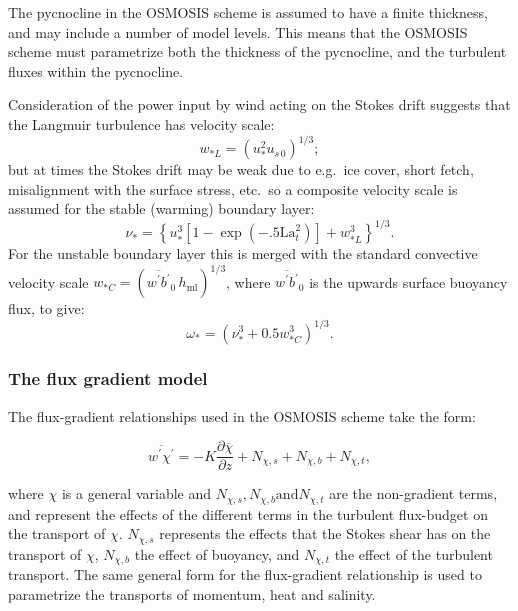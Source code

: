 \documentclass[../main/NEMO_manual]{subfiles}
\begin{document}
The pycnocline in the OSMOSIS scheme is assumed to have a finite thickness, and may include a number of model levels. This means that the OSMOSIS scheme must parametrize both the thickness of the pycnocline, and the turbulent fluxes within the pycnocline.

Consideration of the power input by wind acting on the Stokes drift suggests that the Langmuir turbulence has velocity scale:
\begin{equation}
  \label{eq:ZDF_w_La}
  w_{*L}= \left(u_*^2 u_{s\,0}\right)^{1/3};
\end{equation}
but at times the Stokes drift may be weak due to e.g.\ ice cover, short fetch, misalignment with the surface stress, etc.\ so  a composite velocity scale is assumed for the stable (warming) boundary layer:
\begin{equation}
  \label{eq:ZDF_composite-nu}
  \nu_{\ast}= \left\{ u_*^3 \left[1-\exp(-.5 \mathrm{La}_t^2)\right]+w_{*L}^3\right\}^{1/3}.
\end{equation}
For the unstable boundary layer this is merged with the standard convective velocity scale $w_{*C}=\left(\overline{w^\prime b^\prime}_0 \,h_\mathrm{ml}\right)^{1/3}$, where $\overline{w^\prime b^\prime}_0$ is the upwards surface buoyancy flux, to give:
\begin{equation}
  \label{eq:ZDF_vel-scale-unstable}
  \omega_* = \left(\nu_*^3 + 0.5 w_{*C}^3\right)^{1/3}.
\end{equation}

\subsubsection{The flux gradient model}
The flux-gradient relationships used in the OSMOSIS scheme take the form:

\begin{equation}
  \label{eq:ZDF_flux-grad-gen}
  \overline{w^\prime\chi^\prime}=-K\frac{\partial\overline{\chi}}{\partial z} + N_{\chi,s} +N_{\chi,b} +N_{\chi,t},
\end{equation}

where $\chi$ is a general variable and $N_{\chi,s}, N_{\chi,b} \mathrm{and} N_{\chi,t}$  are the non-gradient terms, and represent the effects of the different terms in the turbulent flux-budget on the transport of $\chi$. $N_{\chi,s}$ represents the effects that the Stokes shear has on the transport of $\chi$, $N_{\chi,b}$  the effect of buoyancy, and $N_{\chi,t}$ the effect of the turbulent transport.  The same general form for the flux-gradient relationship is used to parametrize the transports of momentum, heat and salinity.
\end{document}
